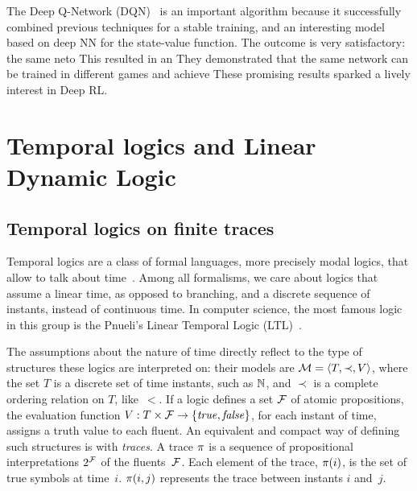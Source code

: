 The Deep Q-Network (DQN)~\cite{bib:atari-deeprl} is an important algorithm
because it successfully combined previous techniques for a stable training,
and an interesting model based on deep NN for the state-value function.
The outcome is very satisfactory: the same neto
This resulted in an 
They demonstrated that the same network can be trained in different games and
achieve These promising
results sparked a lively interest in Deep RL.






\clearpage
\section{Temporal logics and Linear Dynamic Logic}

\subsection{Temporal logics on finite traces}

Temporal logics are a class of formal languages, more precisely modal logics,
that allow to talk about time~\cite{bib:temporal-logics-stanford}. Among all
formalisms, we care about logics that assume a linear time, as opposed to
branching, and a discrete sequence of instants, instead of continuous time.
In computer science, the most famous logic in this group is the Pnueli's
Linear Temporal Logic (LTL)~\cite{bib:pnueli-ltl}.

The assumptions about the nature of time directly reflect to the type of
structures these logics are interpreted on: their models are $\mathcal{M} =
\langle T, \prec, V \rangle$, where the set $T$ is a discrete set of time
instants, such as $\mathbb{N}$, and $\prec$ is a complete ordering relation on $T$,
like~$<$. If a logic defines a set $\mathcal{F}$ of atomic propositions, the
evaluation function $V: T \times \mathcal{F} \to \{\text{\textit{true}}, \text{\textit{false}}\}$, for each
instant of time, assigns a truth value to each fluent. An equivalent and
compact way of defining such structures is with \emph{traces}. A trace
$\pi$ is a sequence of propositional interpretations $2^{\mathcal{F}}$ of the 
fluents~$\mathcal{F}$. Each element of the trace, $\pi(i)$, is the set of true
symbols at time~$i$. $\pi(i, j)$ represents the trace between instants $i$
and~$j$.

